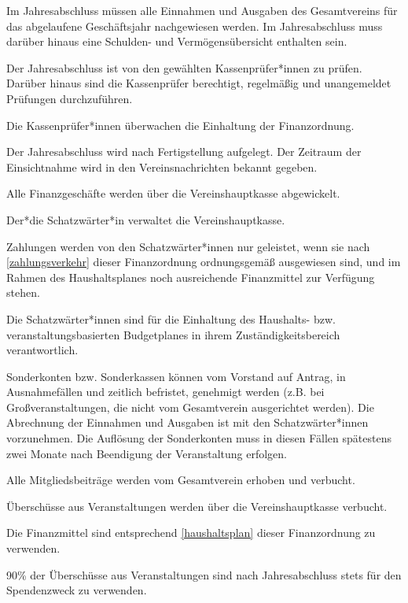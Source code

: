 \begin{finanz}
  Im Jahresabschluss müssen alle Einnahmen und Ausgaben des Gesamtvereins für das abgelaufene Geschäftsjahr nachgewiesen werden. Im Jahresabschluss muss darüber hinaus eine Schulden- und Vermögensübersicht enthalten sein.

  Der Jahresabschluss ist von den gewählten Kassenprüfer*innen zu prüfen. Darüber hinaus sind die Kassenprüfer berechtigt, regelmäßig und unangemeldet Prüfungen durchzuführen.

  Die Kassenprüfer*innen überwachen die Einhaltung der Finanzordnung.

  Der Jahresabschluss wird nach Fertigstellung aufgelegt. Der Zeitraum der Einsichtnahme wird in den Vereinsnachrichten bekannt gegeben.


  Alle Finanzgeschäfte werden über die Vereinshauptkasse abgewickelt.

  Der*die Schatzwärter*in verwaltet die Vereinshauptkasse.

  Zahlungen werden von den Schatzwärter*innen nur geleistet, wenn sie nach \ref{zahlungsverkehr} dieser Finanzordnung ordnungsgemäß ausgewiesen sind, und im Rahmen des Haushaltsplanes noch ausreichende Finanzmittel zur Verfügung stehen.

  Die Schatzwärter*innen sind für die Einhaltung des Haushalts- bzw. veranstaltungsbasierten Budgetplanes in ihrem Zuständigkeitsbereich verantwortlich.

  Sonderkonten bzw. Sonderkassen können vom Vorstand auf Antrag, in Ausnahmefällen und zeitlich befristet, genehmigt werden (z.B. bei Großveranstaltungen, die nicht vom Gesamtverein ausgerichtet werden). Die Abrechnung der Einnahmen und Ausgaben ist mit den Schatzwärter*innen vorzunehmen. Die Auflösung der Sonderkonten muss in diesen Fällen spätestens zwei Monate nach Beendigung der Veranstaltung erfolgen.


  Alle Mitgliedsbeiträge werden vom Gesamtverein erhoben und verbucht.

  Überschüsse aus Veranstaltungen werden über die Vereinshauptkasse verbucht.

  Die Finanzmittel sind entsprechend \ref{haushaltsplan} dieser Finanzordnung zu verwenden.

  90\% der Überschüsse aus Veranstaltungen sind nach Jahresabschluss stets für den Spendenzweck zu verwenden.


\end{finanz}
